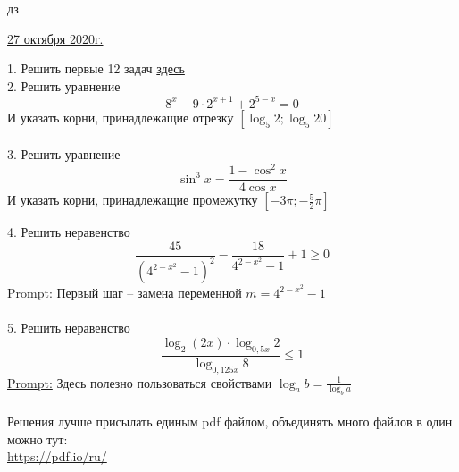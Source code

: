 \documentclass{article}
\begin{document}
\large
\begin{center}
    дз
\end{center}
\begin{flushleft}
\underline{27 октября 2020г.}
\end{flushleft}

1. Решить первые 12 задач 
\href{https://math-ege.sdamgia.ru/pdf/ee3df7f8c981e9c854881f4ca92d1167.pdf}{здесь} \\
2. Решить уравнение 
\[ 8^x - 9\cdot 2^{x + 1} + 2^{5 - x} = 0 \]
И указать корни, принадлежащие отрезку \( \left[ \log_5 2; \log_5 20\right] \) \\ \\
3. Решить уравнение 
\[ \sin^{3} x = \frac{1 - \cos^2 x}{4 \cos x}\]
И указать корни, принадлежащие промежутку \( \left[ -3\pi; - \frac{5}{2} \pi \right] \)

4. Решить неравенство 
\[ \frac{45}{\left( 4^{2 - x^2} - 1\right)^2} - \frac{18}{ 4^{2 - x^2} - 1 } + 1 \geq 0\]
\underline{Prompt:} Первый шаг -- замена переменной \( m = 4^{2 - x^2} - 1\) \\ \\
5. Решить неравенство 
\[ \frac{\log_2 (2x) \cdot \log_{0,5x} 2}{\log_{0,125 x} 8}  \leq 1 \]
\underline{Prompt:} Здесь полезно пользоваться свойствами \( \log_a b = \frac{1}{\log_b a} \) \\ \\
Решения лучше присылать единым pdf файлом, объединять много файлов в один можно тут: \\
\href{https://pdf.io/ru/}{https://pdf.io/ru/}
\end{document}

